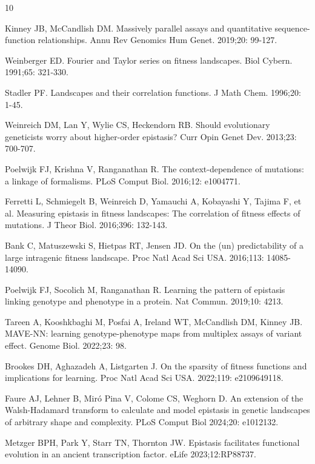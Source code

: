 \documentclass[10pt,letterpaper]{article}
\begin{document}
\begin{thebibliography}{10}

 Kinney JB, McCandlish DM. Massively parallel assays and quantitative sequence-function relationships. Annu Rev Genomics Hum Genet. 2019;20: 99-127. 

 Weinberger ED. Fourier and Taylor series on fitness landscapes. Biol Cybern. 1991;65: 321-330.

 Stadler PF. Landscapes and their correlation functions. J Math Chem. 1996;20: 1-45.

 Weinreich DM, Lan Y, Wylie CS, Heckendorn RB. Should evolutionary geneticists worry about higher-order epistasis? Curr Opin Genet Dev. 2013;23: 700-707.

 Poelwijk FJ, Krishna V, Ranganathan R. The context-dependence of mutations: a linkage of formalisms. PLoS Comput Biol. 2016;12: e1004771.

 Ferretti L, Schmiegelt B, Weinreich D, Yamauchi A, Kobayashi Y, Tajima F, et al. Measuring epistasis in fitness landscapes: The correlation of fitness effects of mutations. J Theor Biol. 2016;396: 132-143.

 Bank C, Matuszewski S, Hietpas RT, Jensen JD. On the (un) predictability of a large intragenic fitness landscape. Proc Natl Acad Sci USA. 2016;113: 14085-14090.

 Poelwijk FJ, Socolich M, Ranganathan R. Learning the pattern of epistasis linking genotype and phenotype in a protein. Nat Commun. 2019;10: 4213.

 Tareen A, Kooshkbaghi M, Posfai A, Ireland WT, McCandlish DM, Kinney JB. MAVE-NN: learning genotype-phenotype maps from multiplex assays of variant effect. Genome Biol. 2022;23: 98. 

 Brookes DH, Aghazadeh A, Listgarten J. On the sparsity of fitness functions and implications for learning. Proc Natl Acad Sci USA. 2022;119: e2109649118. 

 Faure AJ, Lehner B, Mir\'{o} Pina V, Colome CS, Weghorn D. An extension of the Walsh-Hadamard transform to calculate and model epistasis in genetic landscapes of arbitrary shape and complexity. PLoS Comput Biol 2024;20: e1012132.

 Metzger BPH, Park Y, Starr TN, Thornton JW. Epistasis facilitates functional evolution in an ancient transcription factor. eLife 2023;12:RP88737.


\end{thebibliography}
\end{document}
